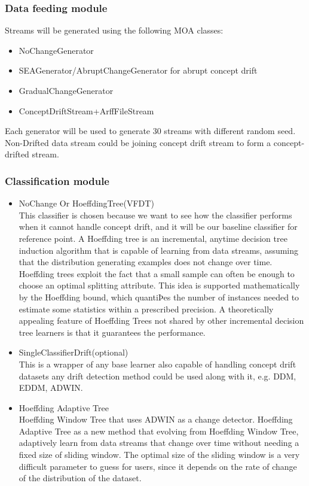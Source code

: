 \documentclass[11pt]{article}\usepackage[]{graphicx}\usepackage[]{color}
\begin{document}
\subsubsection{Data feeding module}
Streams will be generated using the following MOA classes:
\begin{itemize}
\item NoChangeGenerator
\item SEAGenerator/AbruptChangeGenerator for abrupt concept drift
\item GradualChangeGenerator
\item ConceptDriftStream+ArffFileStream
\end{itemize}
Each generator will be used to generate 30 streams with different random seed.  Non-Drifted data stream could be joining concept drift stream to form a concept-drifted stream.

\subsubsection{Classification module}

\begin{itemize}
\item NoChange Or HoeffdingTree(VFDT)
\\
This classifier is chosen because we want to see how the classifier performs when it cannot handle concept drift, and it will be our baseline classifier for reference point. A Hoeffding tree is an incremental, anytime decision tree induction algorithm that is capable of learning from data streams, assuming that the distribution generating examples does not change over time. Hoeffding trees exploit the fact that a small sample can often be enough to choose an optimal splitting attribute. This idea is supported mathematically by the Hoeffding bound, which quantiÞes the number of instances needed to estimate some statistics within a prescribed precision.
A theoretically appealing feature of Hoeffding Trees not shared by other incremental decision tree learners is that it guarantees the performance. 

\item SingleClassifierDrift(optional) 
\\
This is a wrapper of any base learner also capable of handling concept drift datasets any drift detection method could be used along with it, e.g. DDM, EDDM, ADWIN.
\item Hoeffding Adaptive Tree
\\
Hoeffding Window Tree that uses ADWIN as a change detector. Hoeffding Adaptive Tree as a new method that evolving from Hoeffding Window Tree, adaptively learn from data streams that change over time without needing a fixed size of sliding window. The optimal size of the sliding window is a very difficult parameter to guess for users, since it depends on the rate of change of the distribution of the dataset. 
\end{itemize}
				
\end{document}
